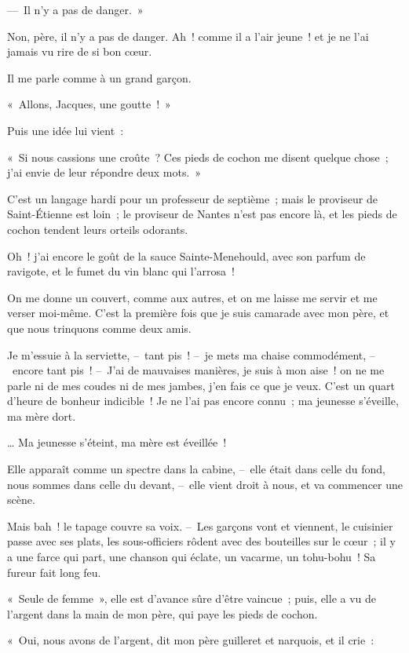 \documentclass[french,twoside]{book} %
\begin{document}
— Il n’y a pas de danger. »\par
Non, père, il n’y a pas de danger. Ah ! comme il a l’air jeune ! et je ne l’ai jamais vu rire de si bon cœur.\par
Il me parle comme à un grand garçon.\par
« Allons, Jacques, une goutte ! »\par
Puis une idée lui vient :\par
« Si nous cassions une croûte ? Ces pieds de cochon me disent quelque chose ; j’ai envie de leur répondre deux mots. »\par
C’est un langage hardi pour un professeur de septième ; mais le proviseur de Saint-Étienne est loin ; le proviseur de Nantes n’est pas encore là, et les pieds de cochon tendent leurs orteils odorants.\par
Oh ! j’ai encore le goût de la sauce Sainte-Menehould, avec son parfum de ravigote, et le fumet du vin blanc qui l’arrosa !\par
\bigbreak
\noindent On me donne un couvert, comme aux autres, et on me laisse me servir et me verser moi-même. C’est la première fois que je suis camarade avec mon père, et que nous trinquons comme deux amis.\par
Je m’essuie à la serviette, – tant pis ! – je mets ma chaise commodément, – encore tant pis ! – J’ai de mauvaises manières, je suis à mon aise ! on ne me parle ni de mes coudes ni de mes jambes, j’en fais ce que je veux. C’est un quart d’heure de bonheur indicible ! Je ne l’ai pas encore connu ; ma jeunesse s’éveille, ma mère dort.\par
\bigbreak
\noindent … Ma jeunesse s’éteint, ma mère est éveillée !\par
Elle apparaît comme un spectre dans la cabine, – elle était dans celle du fond, nous sommes dans celle du devant, – elle vient droit à nous, et va commencer une scène.\par
Mais bah ! le tapage couvre sa voix. – Les garçons vont et viennent, le cuisinier passe avec ses plats, les sous-officiers rôdent avec des bouteilles sur le cœur ; il y a une farce qui part, une chanson qui éclate, un vacarme, un tohu-bohu ! Sa fureur fait long feu.\par
« Seule de femme », elle est d’avance sûre d’être vaincue ; puis, elle a vu de l’argent dans la main de mon père, qui paye les pieds de cochon.\par
« Oui, nous avons de l’argent, dit mon père guilleret et narquois, et il crie :\par
\end{document}
